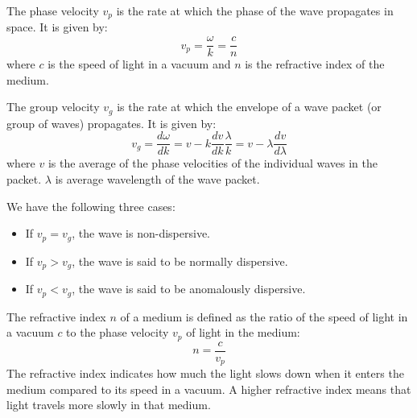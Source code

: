 \documentclass[11pt]{report}
\begin{document}
\begin{definition}
    The phase velocity \( v_p \) is the rate at which the phase of the wave propagates in space. It is given by:
    \begin{equation}
        v_p = \frac{\omega}{k}  = \frac{c}{n}
    \end{equation}
    where \( c \) is the speed of light in a vacuum and \( n \) is the refractive index of the medium.

    The group velocity \( v_g \) is the rate at which the envelope of a wave packet (or group of waves) propagates. It is given by:
    \begin{equation}
        v_g = \frac{d\omega}{dk} = v - k \frac{dv}{dk} \frac{\lambda}{k} = v - \lambda \frac{dv}{d\lambda}
    \end{equation}
    where \( v \) is the average of the phase velocities of the individual waves in the packet. $\lambda$ is average wavelength of the wave packet.

    We have the following three cases:
    \begin{itemize}
        \item If \( v_p = v_g \), the wave is non-dispersive.
        \item If \( v_p > v_g \), the wave is said to be normally dispersive.
        \item If \( v_p < v_g \), the wave is said to be anomalously dispersive.
    \end{itemize}
\end{definition}
\begin{definition}
    The refractive index \( n \) of a medium is defined as the ratio of the speed of light in a vacuum \( c \) to the phase velocity \( v_p \) of light in the medium:
    \begin{equation}
        n = \frac{c}{v_p}
    \end{equation}
    The refractive index indicates how much the light slows down when it enters the medium compared to its speed in a vacuum. A higher refractive index means that light travels more slowly in that medium.
\end{definition}
\end{document}
